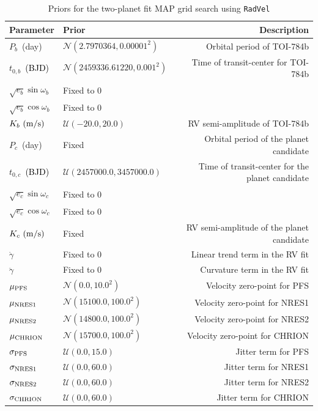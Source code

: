 \documentclass[twocolumn]{aastex631}
\newcommand{\rev}[1]{\textcolor{black}{#1}}
\newcommand{\code}[1]{{\texttt{#1}}}
\begin{document}
\begin{table}
 	\centering
 	\caption{Priors for the two-planet fit MAP grid search using \code{RadVel}}
 	\label{tab:priors-two-planet-fit-radvel}
 	\begin{tabular}{llr} %
 		\hline
 		\hline
		Parameter & Prior & Description\\
 		\hline
		$P_b$~(day) & $\mathcal{N}(2.7970364, 0.00001^2)$  & Orbital period of TOI-784b\\
		$t_{0,b}$~\rev{(BJD)} & $\mathcal{N}(2459336.61220, 0.001^2)$  & Time of transit-center for TOI-784b\\
		$\sqrt{e_b}\sin\omega_b$ & Fixed to 0\\
		$\sqrt{e_b}\cos\omega_b$ & Fixed to 0\\
		$K_b\ (\rm{m/s})$ & $\mathcal{U}(-20.0, 20.0)$ & RV semi-amplitude of TOI-784b\\
		$P_c$~(day) & Fixed & Orbital period of the planet candidate\\
		$t_{0,c}$~\rev{(BJD)} & $\mathcal{U}(2457000.0, 3457000.0)$ & Time of transit-center for the planet candidate\\
		$\sqrt{e_c}\sin\omega_c$ & Fixed to 0\\
		$\sqrt{e_c}\cos\omega_c$ & Fixed to 0\\
		$K_c\ (\rm{m/s})$ & Fixed & RV semi-amplitude of the planet candidate\\
		$\dot{\gamma}$ & Fixed to 0 & Linear trend term in the RV fit\\
		$\ddot{\gamma}$ & Fixed to 0 & Curvature term in the RV fit\\
		$\mu_{\rm{PFS}}$  & $\mathcal{N}(0.0, 10.0^2)$ & Velocity zero-point for PFS\\
		$\mu_{\rm{NRES1}}$  & $\mathcal{N}(15100.0, 100.0^2)$ & Velocity zero-point for NRES1\\
		$\mu_{\rm{NRES2}}$  & $\mathcal{N}(14800.0, 100.0^2)$ & Velocity zero-point for NRES2\\
		$\mu_{\rm{CHRION}}$  & $\mathcal{N}(15700.0, 100.0^2)$ & Velocity zero-point for CHRION\\
		$\sigma_{\rm{PFS}}$ & $\mathcal{U}(0.0, 15.0)$ & Jitter term for PFS\\
		$\sigma_{\rm{NRES1}}$ & $\mathcal{U}(0.0, 60.0)$ & Jitter term for NRES1\\
		$\sigma_{\rm{NRES2}}$ & $\mathcal{U}(0.0, 60.0)$ & Jitter term for NRES2\\
		$\sigma_{\rm{CHRION}}$ & $\mathcal{U}(0.0, 60.0)$ & Jitter term for CHRION\\
 		\hline
 	\end{tabular}
\end{table}
\end{document}
